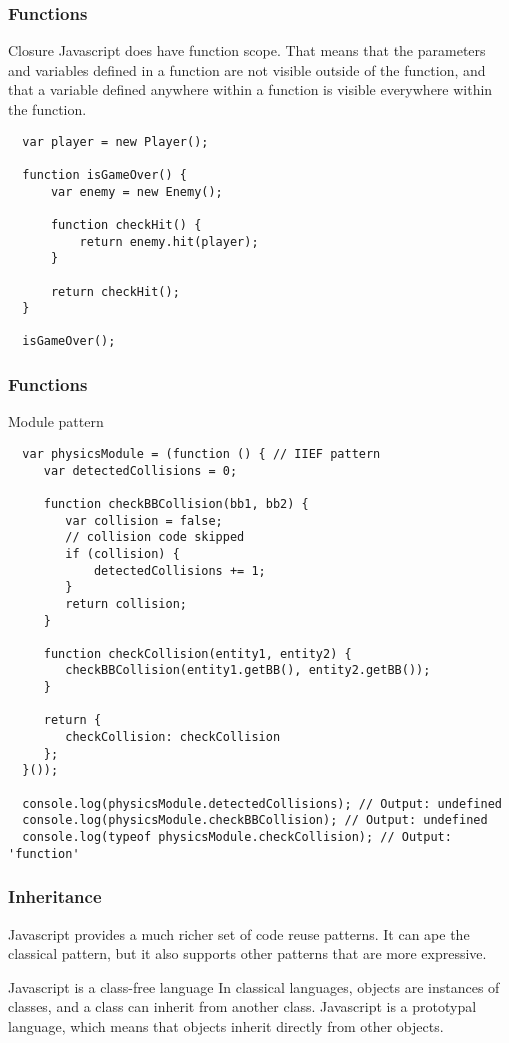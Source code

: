 \begin{frame}[fragile]
  \frametitle{Functions}

  \begin{block}{Closure}
  Javascript does have function scope. That means that the parameters and variables defined in a function are not visible outside of the function, and that a variable defined anywhere within a function is visible everywhere within the function.
  {\scriptsize
  \begin{verbatim}
  var player = new Player();

  function isGameOver() {
      var enemy = new Enemy();

      function checkHit() {
          return enemy.hit(player);
      }

      return checkHit();
  }

  isGameOver();
  \end{verbatim}
  }
  \end{block}

\end{frame}

\begin{frame}[fragile]
  \frametitle{Functions}
  \begin{block}{Module pattern}
  {\tiny
  \begin{verbatim}
  var physicsModule = (function () { // IIEF pattern
     var detectedCollisions = 0;

     function checkBBCollision(bb1, bb2) {
        var collision = false;
        // collision code skipped
        if (collision) {
            detectedCollisions += 1;
        }
        return collision;
     }

     function checkCollision(entity1, entity2) {
        checkBBCollision(entity1.getBB(), entity2.getBB());
     }

     return {
        checkCollision: checkCollision
     };
  }());

  console.log(physicsModule.detectedCollisions); // Output: undefined
  console.log(physicsModule.checkBBCollision); // Output: undefined
  console.log(typeof physicsModule.checkCollision); // Output: 'function'
  \end{verbatim}
  }
  \end{block}
\end{frame}

\begin{frame}[fragile]
  \frametitle{Inheritance}

  Javascript provides a much richer set of code reuse patterns. It can ape the classical pattern, but it also supports other patterns that are more expressive.

  \pause

  \begin{block}{Javascript is a class-free language}
    In classical languages, objects are instances of classes, and a class can inherit from another class. Javascript is a prototypal language, which means that objects inherit directly from other objects.
  \end{block}
  
\end{frame}

